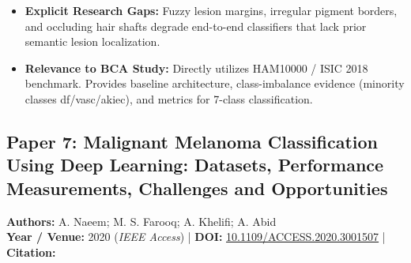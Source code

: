 \documentclass[11pt,a4paper]{article}
\begin{document}
\begin{itemize}
\item \textbf{Explicit Research Gaps:} Fuzzy lesion margins, irregular pigment borders, and occluding hair shafts degrade end-to-end classifiers that lack prior semantic lesion localization.
\item \textbf{Relevance to BCA Study:} Directly utilizes HAM10000 / ISIC 2018 benchmark. Provides baseline architecture, class-imbalance evidence (minority classes df/vasc/akiec), and metrics for 7-class classification.
\end{itemize}

\subsection{Paper 7: Malignant Melanoma Classification Using Deep Learning: Datasets, Performance Measurements, Challenges and Opportunities}
\textbf{Authors:} A. Naeem; M. S. Farooq; A. Khelifi; A. Abid \\
\textbf{Year / Venue:} 2020 (\textit{IEEE Access}) | \textbf{DOI:} \href{https://doi.org/10.1109/ACCESS.2020.3001507}{10.1109/ACCESS.2020.3001507} | \textbf{Citation:} \cite{9113301}
\end{document}
